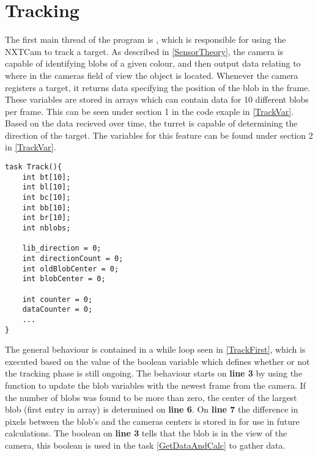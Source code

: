 \section{Tracking}
The first main thread of the program is , which is responsible
for using the NXTCam to track a target. As described in \autoref{SensorTheory}, the camera
is capable of identifying blobs of a given colour, and then output data relating to where
in the cameras field of view the object is located. Whenever the camera
registers a target, it returns data specifying the position of the blob in the
frame. These variables are stored in arrays which can contain data for 10
different blobs per frame. This can be seen under section 1 in the code exaple
in \autoref{TrackVar}. Based on the data recieved over time, the turret is
capable of determining the direction of the target. The variables
for this feature can be found under section 2 in \autoref{TrackVar}.\nl
 
\begin{minipage}[H]{\linewidth}
\begin{lstlisting}[caption = Variables used on the Track() thread., label = TrackVar, style = nc] 
task Track(){
    int bt[10];
    int bl[10];
    int bc[10];
    int bb[10];
    int br[10];
    int nblobs;

    lib_direction = 0;
    int directionCount = 0;
    int oldBlobCenter = 0;
    int blobCenter = 0;

    int counter = 0;
    dataCounter = 0;
    ...
}
\end{lstlisting}
\end{minipage}

The general behaviour is contained in a while loop seen in \autoref{TrackFirst},
which is executed based on the value of the boolean variable
 which defines whether or not the tracking phase is still
ongoing. The behaviour starts on \textbf{line 3} by using the
 function to update the blob variables with
the newest frame from the camera. If the number of blobs was found to be more
than zero, the center of the largest blob (first entry in array) is determined on
\textbf{line 6}. On \textbf{line 7} the difference in pixels between the blob's
and the cameras centers is stored in  for use in future
calculations. The boolean on \textbf{line 3} tells that the blob is in the view
of the camera, this boolean is used in the  task
\autoref{GetDataAndCalc} to gather data.\nl
  
